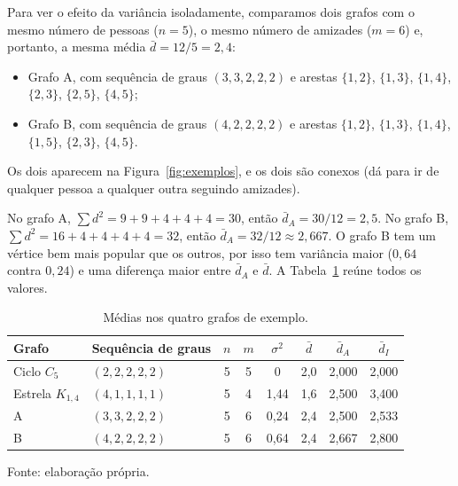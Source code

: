 \documentclass[12pt,a4paper]{article}
\theoremstyle{plain}
\theoremstyle{definition}
\theoremstyle{remark}
\newcommand{\dm}{\bar d}          %
\newcommand{\dA}{\bar d_{A}}      %
\newcommand{\dI}{\bar d_{I}}      %
\begin{document}
Para ver o efeito da variância isoladamente, comparamos dois grafos com
o mesmo número de pessoas ($n=5$), o mesmo número de amizades ($m=6$) e,
portanto, a mesma média $\dm = 12/5 = 2{,}4$:
\begin{itemize}
  \item Grafo A, com sequência de graus $(3,3,2,2,2)$ e arestas
        $\{1,2\}$, $\{1,3\}$, $\{1,4\}$, $\{2,3\}$, $\{2,5\}$, $\{4,5\}$;
  \item Grafo B, com sequência de graus $(4,2,2,2,2)$ e arestas
        $\{1,2\}$, $\{1,3\}$, $\{1,4\}$, $\{1,5\}$, $\{2,3\}$, $\{4,5\}$.
\end{itemize}
Os dois aparecem na Figura~\ref{fig:exemplos}, e os dois são conexos
(dá para ir de qualquer pessoa a qualquer outra seguindo amizades).

No grafo A, $\sum d^2 = 9+9+4+4+4 = 30$, então $\dA = 30/12 = 2{,}5$.
No grafo B, $\sum d^2 = 16+4+4+4+4 = 32$, então $\dA = 32/12 \approx 2{,}667$.
O grafo B tem um vértice bem mais popular que os outros, por isso tem
variância maior ($0{,}64$ contra $0{,}24$) e uma diferença maior entre
$\dA$ e $\dm$. A Tabela~\ref{tab:exemplos} reúne todos os valores.

\begin{table}[htbp]
\centering
\caption{Médias nos quatro grafos de exemplo.}\label{tab:exemplos}
\begin{tabular}{llcccccc}
\toprule
Grafo & Sequência de graus & $n$ & $m$ & $\sigma^2$ & $\dm$ & $\dA$ & $\dI$\\
\midrule
Ciclo $C_5$       & $(2,2,2,2,2)$ & 5 & 5 & 0    & 2,0 & 2,000 & 2,000\\
Estrela $K_{1,4}$ & $(4,1,1,1,1)$ & 5 & 4 & 1,44 & 1,6 & 2,500 & 3,400\\
A                 & $(3,3,2,2,2)$ & 5 & 6 & 0,24 & 2,4 & 2,500 & 2,533\\
B                 & $(4,2,2,2,2)$ & 5 & 6 & 0,64 & 2,4 & 2,667 & 2,800\\
\bottomrule
\end{tabular}

\smallskip
{\footnotesize Fonte: elaboração própria.}
\end{table}
\end{document}
